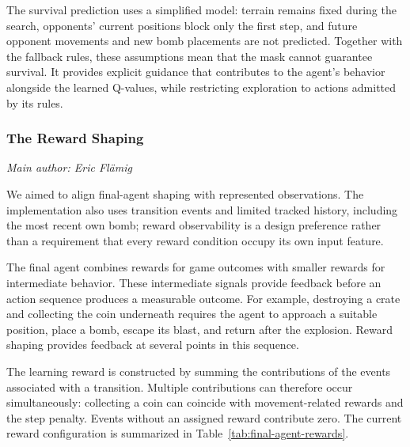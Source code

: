 \documentclass[11pt,a4paper]{article}
\newcommand{\contributionauthor}[1]{{\small\textit{Main author: #1}\par}}
\begin{document}
The survival prediction uses a simplified model: terrain remains
fixed during the search, opponents' current positions block only
the first step, and future opponent movements and new bomb
placements are not predicted. Together with the fallback rules,
these assumptions mean that the mask cannot guarantee survival.
It provides explicit guidance that contributes to the agent's
behavior alongside the learned Q-values, while restricting
exploration to actions admitted by its rules.

\subsubsection{The Reward Shaping}
\contributionauthor{Eric Flämig}
We aimed to align final-agent shaping with represented observations. The implementation also uses transition events and limited tracked history, including the most recent own bomb; reward observability is a design preference rather than a requirement that every reward condition occupy its own input feature.

The final agent combines rewards for game outcomes with smaller
rewards for intermediate behavior. These intermediate signals provide
feedback before an action sequence produces a measurable outcome.
For example, destroying a crate and collecting the coin underneath
requires the agent to approach a suitable position, place a bomb,
escape its blast, and return after the explosion. Reward shaping
provides feedback at several points in this sequence.

The learning reward is constructed by summing the contributions of
the events associated with a transition. Multiple contributions can
therefore occur simultaneously: collecting a coin can coincide with
movement-related rewards and the step penalty. Events without an
assigned reward contribute zero. The current reward configuration is
summarized in Table~\ref{tab:final-agent-rewards}.
\end{document}
